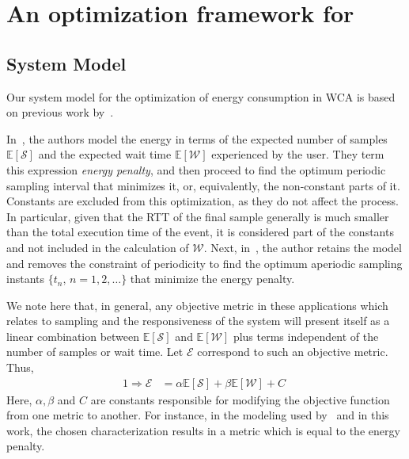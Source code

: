\section{An optimization framework for }

\subsection{System Model}

Our system model for the optimization of energy consumption in \gls{WCA} is based on previous work by~\cite{moothedath2021energy,moothedath2022energy1,moothedath2022energy2}.

In~\cite{moothedath2021energy,moothedath2022energy1}, the authors model the energy in terms of the expected number of samples $\mathbb{E}[\mathcal{S}]$ and the expected wait time $\mathbb{E}[\mathcal{W}]$ experienced by the user.
They term this expression \emph{energy penalty}, and then proceed to find the optimum periodic sampling interval that minimizes it, or, equivalently, the non-constant parts of it.
Constants are excluded from this optimization, as they do not affect the process.
In particular, given that the \gls{RTT} of the final sample generally is much smaller than the total execution time of the event, it is considered part of the constants and not included in the calculation of $\mathcal{W}$.
Next, in~\cite{moothedath2022energy2}, the author retains the model and removes the constraint of periodicity to find the optimum aperiodic sampling instants $\{t_n,\,n=1,2,\dots\}$ that minimize the energy penalty.

We note here that, in general, any objective metric in these applications which relates to sampling and the responsiveness of the system will present itself as a linear combination between $\mathbb{E}[\mathcal{S}]$ and $\mathbb{E}[\mathcal{W}]$ plus terms independent of the number of samples or wait time.
Let $\mathcal{E}$ correspond to such an objective metric.
Thus, 
\begin{alignat}{1}
    \Rightarrow\mathcal{E}&=\alpha\mathbb{E}[\mathcal{S}]+\beta\mathbb{E}[\mathcal{W}]+C\;\label{eq:epsilon_terminal}
\end{alignat}
Here, $\alpha, \beta$ and $C$ are constants responsible for modifying the objective function from one metric to another.
For instance, in the modeling used by~\cite{moothedath2021energy,moothedath2022energy1,moothedath2022energy2} and in this work, the chosen characterization results in a metric which is equal to the energy penalty.

